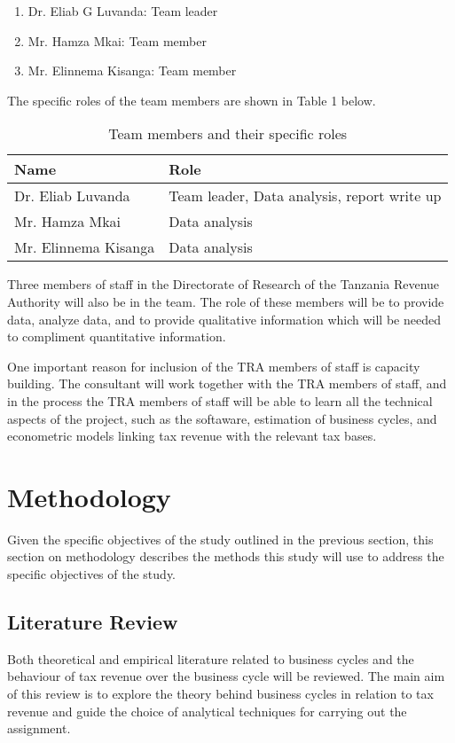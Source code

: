 \documentclass[12pt,a4paper,final]{article}
\begin{document}
\begin{enumerate}
\item Dr. Eliab G Luvanda: Team leader
\item Mr. Hamza Mkai: Team member
\item Mr. Elinnema Kisanga: Team member
\end{enumerate}

The specific roles of the team members are shown in Table 1 below.

\begin{table}[h]
\centering
\caption{Team members and their specific roles}
\begin{tabular}{|l|l|}
\hline Name  & Role \\ 
\hline Dr. Eliab Luvanda  & Team leader, Data analysis, report write up  \\ 
\hline Mr. Hamza Mkai  & Data analysis \\ 
\hline Mr. Elinnema Kisanga & Data analysis \\ 
\hline 
\end{tabular} 
\end{table}

Three members of staff in the Directorate of Research of the Tanzania Revenue Authority will also be in the team.  The role of these members will be to provide data, analyze data, and to provide qualitative information which will be needed to compliment quantitative information.

One important reason for inclusion of the TRA members of staff is capacity building.  The consultant will work together with the TRA members of staff, and in the process the TRA members of staff will be able to learn all the technical aspects of the project, such as the softaware, estimation of business cycles, and econometric models linking tax revenue with the relevant tax bases.
\section{Methodology}
Given the specific objectives of the study outlined in the previous section, this section on methodology describes the methods this study will use to address the specific objectives of the study.

\subsection{Literature Review}

Both theoretical and empirical literature related to business cycles and the behaviour of tax revenue over the business cycle will be reviewed.  The main aim of this review is to explore the theory behind business cycles in relation to tax revenue and guide the choice of analytical techniques for carrying out the assignment.
\end{document}
